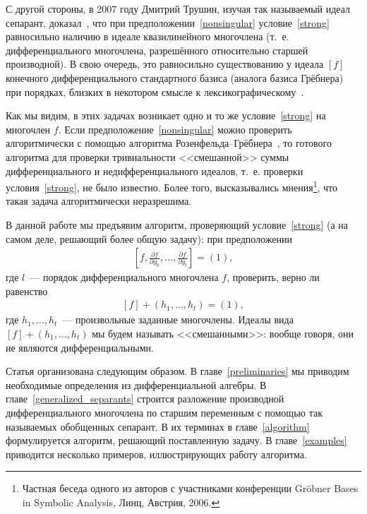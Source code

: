 \documentclass[11pt]{article}
\theoremstyle{plain}
\theoremstyle{definition}
\theoremstyle{remark}
\begin{document}
С другой стороны, в 2007 году Дмитрий Трушин, изучая так называемый идеал сепарант, доказал~\cite{Trushin},
что при предположении~\eqref{nonsingular} условие~\eqref{strong} равносильно наличию в идеале квазилинейного многочлена
(т.~е. дифференциального многочлена, разрешённого относительно старшей производной).
В свою очередь, это равносильно существованию у идеала $[f]$ конечного дифференциального стандартного базиса (аналога базиса Грёбнера)
при порядках, близких в некотором смысле к лексикографическому~\cite{Zobnin}.

Как мы видим, в этих задачах возникает одно и то же условие~\eqref{strong} на многочлен $f$.
Если предположение~\eqref{nonsingular} можно проверить алгоритмически с помощью алгоритма Розенфельда--Грёбнера~\cite{BLOP, Sit},
то готового алгоритма для проверки тривиальности <<смешанной>> суммы дифференциального и недифференциального идеалов, т.~е. проверки условия~\eqref{strong}, не было известно.
Более того, высказывались мнения\footnote{Частная беседа одного из авторов с участниками конференции Gr\"obner Bases in Symbolic Analysis, Линц, Австрия, 2006.}, что такая задача алгоритмически неразрешима.

В данной работе мы предъявим алгоритм, проверяющий условие~\eqref{strong} (а на самом деле, решающий более общую задачу):
при предположении
\begin{gather}
\label{nonsingular_general}
\left[f, \frac{\partial f}{\partial y_0}, \ldots, \frac{\partial f}{\partial y_l} \right] = (1),
\end{gather}
где $l$~--- порядок дифференциального многочлена $f$,
проверить, верно ли равенство
\begin{gather}
\label{strong_general}
[f] + (h_1, \ldots, h_t) = (1),
\end{gather}
где $h_1, \ldots, h_t$~--- произвольные заданные многочлены.
Идеалы вида $[f] + (h_1, \ldots, h_t)$ мы будем называть <<смешанными>>: вообще говоря, они не являются дифференциальными.

Статья организована следующим образом. В главе~\ref{preliminaries} мы приводим необходимые определения из дифференциальной алгебры.
В главе~\ref{generalized_separants} строится разложение производной дифференциального многочлена по старшим переменным
с помощью так называемых обобщенных сепарант. В их терминах в главе~\ref{algorithm} формулируется алгоритм,
решающий поставленную задачу. В главе~\ref{examples} приводится несколько примеров, иллюстрирующих работу алгоритма.
\end{document}
